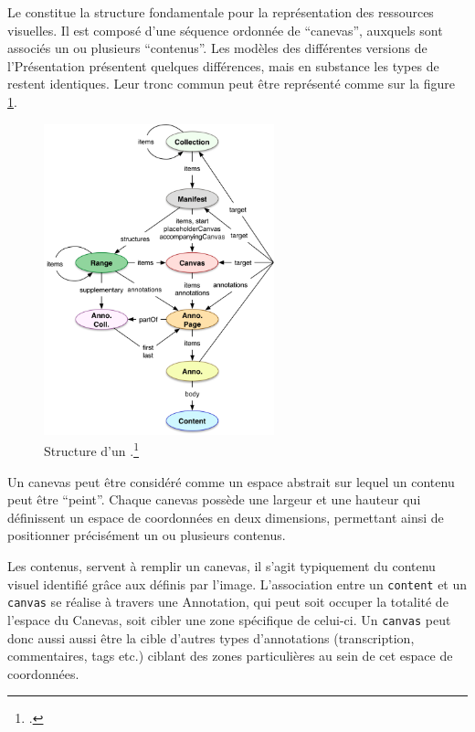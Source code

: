 Le \man \iiif constitue la structure fondamentale pour la
représentation des ressources visuelles. Il est composé d'une séquence
ordonnée de ``canevas'', auxquels sont associés un ou plusieurs
``contenus''. Les modèles des différentes versions de l'\api Présentation
présentent quelques différences, mais en substance les types de
\man restent identiques. Leur tronc commun peut être
représenté comme sur la figure \ref{fig:manifest}.

          \begin{figure}[H]
          \begin{center}
          \includegraphics[height=9cm]{figues/modele_donnees_iiif.png}
          \end{center}
		\caption{Structure d'un \man \iiif.\footcite{appleby_presentation_nodate}}

          \label{fig:manifest} \end{figure}

Un canevas peut être considéré comme un espace abstrait sur lequel un
contenu peut être ``peint''. Chaque canevas possède une largeur et une
hauteur qui définissent un espace de coordonnées en deux dimensions,
permettant ainsi de positionner précisément un ou plusieurs
contenus.

Les contenus, servent à remplir un canevas, il s'agit typiquement du
contenu visuel identifié grâce aux \URLs définis par l'\api image.
L'association entre un \texttt{content} et un \texttt{canvas} se réalise à travers une
Annotation, qui peut soit occuper la totalité de l'espace du Canevas,
soit cibler une zone spécifique de celui-ci. Un \texttt{canvas} peut donc aussi
aussi être la cible d'autres types d'annotations (transcription,
commentaires, tags etc.) ciblant des zones particulières au sein de cet
espace de coordonnées.

